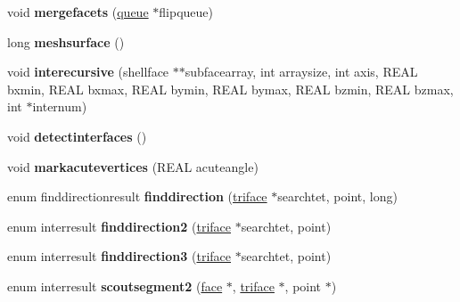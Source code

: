 \begin{DoxyCompactItemize}
\item 
\hypertarget{classtetgenmesh_a73e6d5a8bc12c612798d1b192b6b7aa3}{void {\bfseries mergefacets} (\hyperlink{classtetgenmesh_1_1queue}{queue} $\ast$flipqueue)}\label{classtetgenmesh_a73e6d5a8bc12c612798d1b192b6b7aa3}

\item 
\hypertarget{classtetgenmesh_adbb744bb8dead5a7ae5660043e67a52f}{long {\bfseries meshsurface} ()}\label{classtetgenmesh_adbb744bb8dead5a7ae5660043e67a52f}

\item 
\hypertarget{classtetgenmesh_a4cc5d7457a1d8f7906899ad235fda6e4}{void {\bfseries interecursive} (shellface $\ast$$\ast$subfacearray, int arraysize, int axis, R\-E\-A\-L bxmin, R\-E\-A\-L bxmax, R\-E\-A\-L bymin, R\-E\-A\-L bymax, R\-E\-A\-L bzmin, R\-E\-A\-L bzmax, int $\ast$internum)}\label{classtetgenmesh_a4cc5d7457a1d8f7906899ad235fda6e4}

\item 
\hypertarget{classtetgenmesh_a854e8e8d77d2d1b2b74372a87a1a7717}{void {\bfseries detectinterfaces} ()}\label{classtetgenmesh_a854e8e8d77d2d1b2b74372a87a1a7717}

\item 
\hypertarget{classtetgenmesh_aaddb4cf905fb7f87fb6b2e37354f26ca}{void {\bfseries markacutevertices} (R\-E\-A\-L acuteangle)}\label{classtetgenmesh_aaddb4cf905fb7f87fb6b2e37354f26ca}

\item 
\hypertarget{classtetgenmesh_a4bf2f34ea5470b521fb1cf20c9c6170c}{enum finddirectionresult {\bfseries finddirection} (\hyperlink{classtetgenmesh_1_1triface}{triface} $\ast$searchtet, point, long)}\label{classtetgenmesh_a4bf2f34ea5470b521fb1cf20c9c6170c}

\item 
\hypertarget{classtetgenmesh_a7e9ed0ab16693a3908dc88edb3d7fc19}{enum interresult {\bfseries finddirection2} (\hyperlink{classtetgenmesh_1_1triface}{triface} $\ast$searchtet, point)}\label{classtetgenmesh_a7e9ed0ab16693a3908dc88edb3d7fc19}

\item 
\hypertarget{classtetgenmesh_a227678370096f008a19612485044e825}{enum interresult {\bfseries finddirection3} (\hyperlink{classtetgenmesh_1_1triface}{triface} $\ast$searchtet, point)}\label{classtetgenmesh_a227678370096f008a19612485044e825}

\item 
\hypertarget{classtetgenmesh_a6974dd74c65ab769d37728888057eaeb}{enum interresult {\bfseries scoutsegment2} (\hyperlink{classtetgenmesh_1_1face}{face} $\ast$, \hyperlink{classtetgenmesh_1_1triface}{triface} $\ast$, point $\ast$)}\label{classtetgenmesh_a6974dd74c65ab769d37728888057eaeb}


\end{DoxyCompactItemize}
